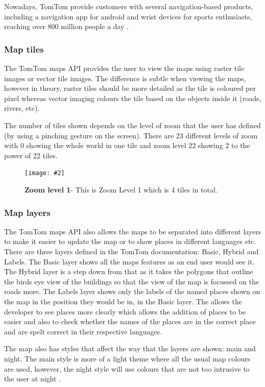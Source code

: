 \documentclass[12pt,a4paper]{article}
\newcommand{\figuremacro}[5]{
    \begin{figure}[#1]
        \centering
        \texttt{[image: \#2]}
        \caption[#3]{\textbf{#3}#4}
        \label{fig:#2}
    \end{figure}
}
\begin{document}
Nowadays, TomTom provide customers with several navigation-based products, including a navigation app for android and wrist devices for sports enthusiasts, reaching over 800 million people a day \cite{TomTomHist}.

\subsubsection{Map tiles}
The TomTom maps API provides the user to view the maps using raster tile images or vector tile images. The difference is subtle when viewing the maps, however in theory, raster tiles should be more detailed as the tile is coloured per pixel whereas vector imaging colours the tile based on the objects inside it (roads, rivers, etc).

The number of tiles shown depends on the level of zoom that the user has defined (by using a pinching gesture on the screen). There are 23 different levels of zoom with 0 showing the whole world in one tile and zoom level 22 showing 2 to the power of 22 tiles. 

\figuremacro{h}{TomTomZoom1}{Zoom level 1}{- This is Zoom Level 1 which is 4 tiles in total.}{1.0} 

\subsubsection{Map layers}
The TomTom maps API also allows the maps to be separated into different layers to make it easier to update the map or to show places in different languages etc. There are three layers defined in the TomTom documentation: Basic, Hybrid and Labels. The Basic layer shows all the maps features as an end user would see it. The Hybrid layer is a step down from that as it takes the polygons that outline the birds eye view of the buildings so that the view of the map is focussed on the roads more. The Labels layer shows only the labels of the named places shown on the map in the position they would be in, in the Basic layer. The allows the developer to see places more clearly which allows the addition of places to be easier and also to check whether the names of the places are in the correct place and are spelt correct in their respective languages.

The map also has styles that affect the way that the layers are shown: main and night. The main style is more of a light theme where all the usual map colours are used, however, the night style will use colours that are not too intrusive to the user at night \cite{TomTomLayers}.
\end{document}
